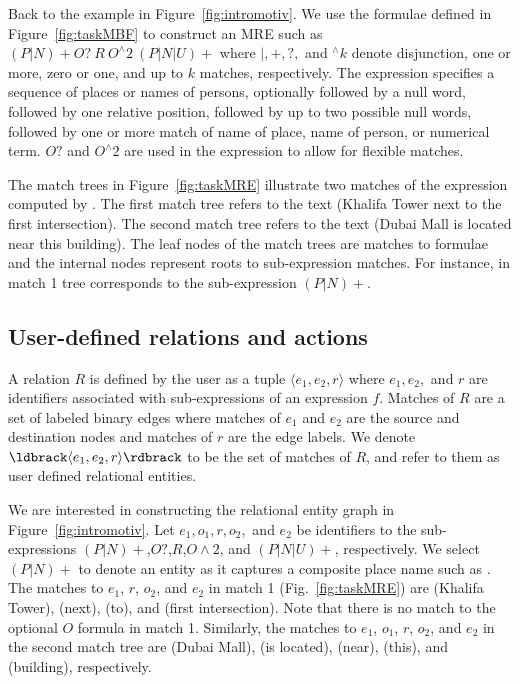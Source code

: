 Back to the example in Figure~\ref{fig:intromotiv}.
We use the formulae defined in Figure~\ref{fig:taskMBF} to construct an MRE such as
$(P|N)\!+O?~R~O^\wedge\!2~(P|N|U)+$ where 
$|,+,?,$ and $^\wedge k$ denote disjunction, one or more, zero or one, and
up to $k$ matches, respectively.
The expression specifies a sequence of places or names of persons, 
optionally followed by a null word, 
followed by one relative position, followed by up to two possible null words, 
followed by one or more match of name of place, name of person, or numerical term.
$O?$ and $O^\wedge 2$ are used in the expression to allow for flexible matches.



The match trees in Figure~\ref{fig:taskMRE} illustrate two matches of the expression computed by \framework.
The first match tree refers to the text 
(Khalifa Tower next to the first intersection).
The second match tree refers to the text 
(Dubai Mall is located near this building).
The leaf nodes of the match trees are matches to formulae and the internal nodes represent roots to sub-expression matches.
For instance,  in match 1 tree corresponds to the sub-expression $(P|N)+$.

\subsection{User-defined relations and actions}

A relation $R$ is defined by the user as a tuple 
$\langle e_1,e_2,r\rangle$ where 
$e_1,e_2,$ and $r$ are identifiers associated with 
sub-expressions of an expression $f$.
Matches of $R$ are a set of labeled binary edges
where matches of $e_1$ and $e_2$ are the source and destination nodes
and matches of $r$ are the edge labels.
We denote $\ldbrack \langle e_1,e_2,r\rangle \rdbrack$ to be the set of matches of $R$, and refer to them as user defined relational entities.

We are interested in constructing the relational entity graph in Figure~\ref{fig:intromotiv}.
Let $e_1,o_1,r,o_2,$ and $e_2$ be identifiers to the sub-expressions 
$(P|N)+$,$O?$,$R$,$O\wedge 2$, and $(P|N|U)+$, respectively.
We select $(P|N)+$ to denote an entity as it captures a composite place name such as .
The matches to $e_1$, $r$, $o_2$, and $e_2$ in match 1 (Fig.~\ref{fig:taskMRE}) are  (Khalifa Tower),  (next),  (to), and  (first intersection).
Note that there is no match to the optional $O$ formula in match 1.
Similarly, the matches to $e_1$, $o_1$, $r$, $o_2$, and $e_2$ in the second match tree are
 (Dubai Mall),  (is located),  (near),  (this), and  (building), respectively.

